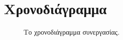 \documentclass[acmtog, nonacm, language=english, language=greek]{acmart}
\begin{document}
\section{Χρονοδιάγραμμα}

\begin{figure*}
\begin{center}
\end{center}
    \caption{Το χρονοδιάγραμμα συνεργασίας.}
\end{figure*}


\end{document}
